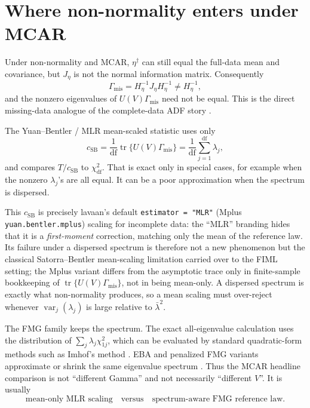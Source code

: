 \documentclass[11pt]{article}
\newcommand{\tr}{\operatorname{tr}}
\begin{document}
\section*{Where non-normality enters under MCAR}

Under non-normality and MCAR, \(\eta^\dagger\) can still equal the full-data
mean and covariance, but \(J_\eta\) is not the normal information matrix.
Consequently
\[
  \Gamma_{\mathrm{mis}}
    =
  H_\eta^{-1}J_\eta H_\eta^{-1}
    \ne
  H_\eta^{-1},
\]
and the nonzero eigenvalues of \(U(V)\Gamma_{\mathrm{mis}}\) need not be
equal. This is the direct missing-data analogue of the complete-data ADF
story \cite{browne1984,yuanbentler2000}.

The Yuan--Bentler / MLR mean-scaled statistic uses only
\[
  c_{\mathrm{SB}}
    =
  \frac{1}{\mathrm{df}}
  \tr\{U(V)\Gamma_{\mathrm{mis}}\}
    =
  \frac{1}{\mathrm{df}}\sum_{j=1}^{\mathrm{df}}\lambda_j,
\]
and compares \(T/c_{\mathrm{SB}}\) to \(\chi^2_{\mathrm{df}}\). That is exact
only in special cases, for example when the nonzero \(\lambda_j\)'s are all
equal. It can be a poor approximation when the spectrum is dispersed.

This \(c_{\mathrm{SB}}\) is precisely lavaan's default \texttt{estimator =
"MLR"} (Mplus \texttt{yuan.bentler.mplus}) scaling for incomplete data: the
``MLR'' branding hides that it is a \emph{first-moment} correction, matching
only the mean of the reference law. Its failure under a dispersed spectrum is
therefore not a new phenomenon but the classical Satorra--Bentler mean-scaling
limitation \cite{satorrabentler1994,yuanbentler2000} carried over to the FIML
setting; the Mplus variant differs from the asymptotic trace only in
finite-sample bookkeeping of \(\tr\{U(V)\Gamma_{\mathrm{mis}}\}\), not in being
mean-only. A dispersed spectrum is exactly what non-normality produces, so a
mean scaling must over-reject whenever \(\operatorname{var}_j(\lambda_j)\) is
large relative to \(\bar\lambda^2\).

The FMG family keeps the spectrum. The exact all-eigenvalue calculation uses
the distribution of \(\sum_j\lambda_j\chi^2_{1j}\), which can be evaluated by
standard quadratic-form methods such as Imhof's method \cite{imhof1961}. EBA
and penalized FMG variants approximate or shrink the same eigenvalue spectrum
\cite{foldnesgronneberg2018,foldnesmossgronneberg2025,foldnesgronnebergmoss2026}.
Thus the MCAR headline comparison is not
``different Gamma'' and not necessarily ``different \(V\)''. It is usually
\[
  \text{mean-only MLR scaling}
  \quad\text{versus}\quad
  \text{spectrum-aware FMG reference law}.
\]
\end{document}
